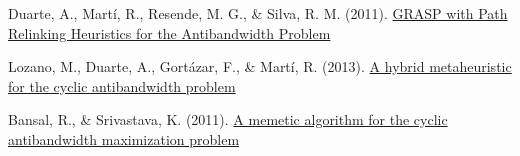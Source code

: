 
\begin{thebibliography}{9}


	Duarte, A., Martí, R., Resende, M. G., \& Silva, R. M. (2011). \href{https://onlinelibrary.wiley.com/doi/full/10.1002/net.20418}{GRASP with Path Relinking Heuristics for the Antibandwidth Problem }


	Lozano, M., Duarte, A., Gortázar, F., \& Martí, R. (2013). \href{https://www.sciencedirect.com/science/article/pii/S0950705113002621}{A hybrid metaheuristic for the cyclic antibandwidth problem}


	Bansal, R., \& Srivastava, K. (2011). \href{https://link.springer.com/article/10.1007/s00500-009-0538-6}{A memetic algorithm for the cyclic antibandwidth maximization problem}

\end{thebibliography}

